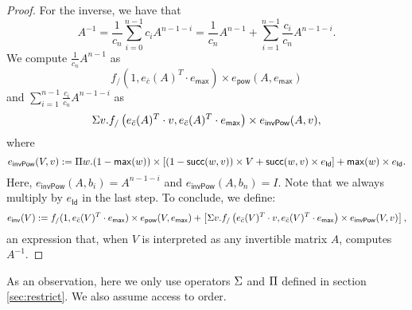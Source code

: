 \begin{proof}
    For the inverse, we have that
    $$
    A^{-1}=\frac{1}{c_n}\sum_{i=0}^{n-1}c_i A^{n-1-i} = \frac{1}{c_n}A^{n-1} + \sum_{i=1}^{n-1}\frac{c_i}{c_n}A^{n-1-i}.
    $$
    We compute $\frac{1}{c_n}A^{n-1}$ as
    $$
    f_{/}(1, e_{\bar c}(A)^T\cdot e_{\mathsf{max}})\times e_{\mathsf{pow}}(A, e_{\mathsf{max}})
    $$
    and $\sum_{i=1}^{n-1}\frac{c_i}{c_n}A^{n-1-i}$ as
    $$
    \Sigma v. f_{/}\left( e_{\bar c}(A)^T\cdot v, e_{\bar c}(A)^T\cdot e_{\mathsf{max}} \right)\times e_{\mathsf{invPow}}(A, v),
    $$
    where
    $$
    e_{\mathsf{invPow}}(V, v):= \Pi w. (1-\mathsf{max}(w)) \times \left[ (1 - \mathsf{succ}(w,v))\times V + \mathsf{succ}(w,v)\times e_{\mathsf{Id}} \right] + \mathsf{max}(w)\times e_{\mathsf{Id}}.
    $$
    Here, $e_{\mathsf{invPow}}(A, b_i)=A^{n-1-i}$ and $e_{\mathsf{invPow}}(A, b_n)=I$.
    Note that we always multiply by $e_{\mathsf{Id}}$ in the last step.
    To conclude, we define:
    $$
    e_{\mathsf{inv}}(V):= f_{/}(1, e_{\bar c}(V)^T\cdot e_{\mathsf{max}})\times e_{\mathsf{pow}}(V, e_{\mathsf{max}}) + \left[ \Sigma v. f_{/}\left( e_{\bar c}(V)^T\cdot v, e_{\bar c}(V)^T\cdot e_{\mathsf{max}} \right)\times e_{\mathsf{invPow}}(V, v) \right],
    $$
    an expression that, when $V$ is interpreted as any invertible matrix $A$, computes $A^{-1}$.
\end{proof}

As an observation, here we only use operators $\Sigma$ and $\Pi$ defined in section \ref{sec:restrict}. 
We also assume access to order.
